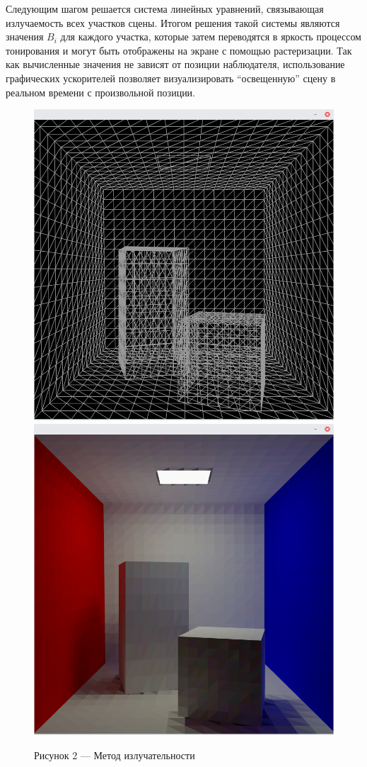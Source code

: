 \documentclass[12pt]{article}
\begin{document}
Следующим шагом решается система линейных уравнений, связывающая излучаемость всех участков сцены. Итогом решения такой системы являются значения $B_i$ для каждого участка, которые затем переводятся в яркость процессом тонирования и могут быть отображены на экране с помощью растеризации. Так как вычисленные значения не зависят от позиции наблюдателя, использование графических ускорителей позволяет визуализировать ``освещенную'' сцену в реальном времени с произвольной позиции.
\begin{figure}[h]
\centering
\includegraphics[scale=0.3]{rad_input.png}
\includegraphics[scale=0.3]{rad_output.png}
\caption*{Рисунок 2 --- Метод излучательности}
\end{figure}
\end{document}
